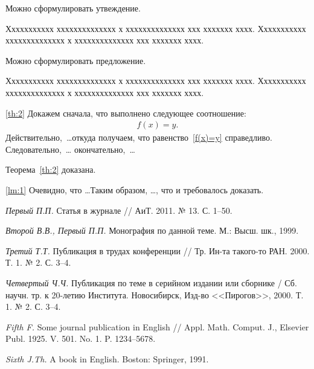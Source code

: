 \documentclass[12pt]{a&t}
\begin{document}
Можно сформулировать утвеждение.

\begin{statement}
Ххххххххххх хххххххххххххх х хххххххххххххх ххх ххххххх хххх.
Ххххххххххх хххххххххххххх х хххххххххххххх ххх ххххххх хххх.
\end{statement}

Можно сформулировать предложение.

\begin{proposition}
Ххххххххххх хххххххххххххх х хххххххххххххх ххх ххххххх хххх.
Ххххххххххх хххххххххххххх х хххххххххххххх ххх ххххххх хххх.
\end{proposition}


\begin{proofoftheorem}{\ref{th:2}}
Докажем сначала, что выполнено следующее соотношение:
\begin{gather} \label{f(x)=y}
    f(x)=y.
\end{gather}
Действительно,~\dots откуда получаем, что
равенство~\eqref{f(x)=y} справедливо. Следовательно,~\dots
окончательно,~\dots

Теорема~\ref{th:2} доказана.
\end{proofoftheorem}

\begin{proofoflemma}{\ref{lm:1}}
Очевидно, что \dots Таким образом, \dots, что и требовалось
доказать.
\end{proofoflemma}


\begin{thebibliography}{10}



{\it Первый П.П.}
Статья в журнале // АиТ. 2011. № 13. С. 1--50.

{\it Второй В.В., Первый П.П.}
Монография по данной теме. М.: Высш. шк., 1999.

{\it Третий Т.Т.}
Публикация в трудах конференции //
Тр. Ин-та такого-то РАН. 2000. Т. 1. № 2. С. 3--4.

{\it Четвертый Ч.Ч.}
Публикация по теме в серийном издании или сборнике /
Сб. научн. тр. к 20-летию Института. Новосибирск, Изд-во <<Пирогов>>, 2000. Т. 1. № 2. С. 3--4.

{\it Fifth F.}
Some journal publication in English //
Appl. Math. Comput. J., Elsevier Publ. 1925. V. 501. No. 1. P. 1234--5678.

{\it Sixth J.Th.}
A book in English. Boston: Springer, 1991.

\end{thebibliography}
\end{document}
